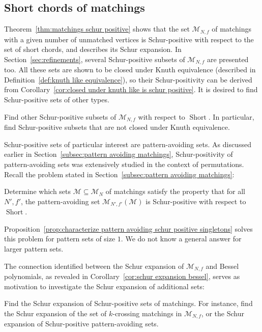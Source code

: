 \documentclass[ALCO]{cedram}
\newcommand{\Short}{\operatorname{Short}}
\newcommand{\M}{\mathcal{M}}
\begin{document}
\subsection{Short chords of matchings}
Theorem~\ref{thm:matchings schur positive} shows that the set $\M_{N,f}$ of matchings with a given number of unmatched vertices is Schur-positive with respect to the set of short chords, and describes its Schur expansion. In Section~\ref{sec:refinements}, several Schur-positive subsets of $\M_{N,f}$ are presented too. All these sets are shown to be closed under Knuth equivalence (described in Definition~\ref{def:knuth like equivalence}), so their Schur-positivity can be derived from Corollary~\ref{cor:closed under knuth like is schur positive}. It is desired to find Schur-positive sets of other types.
\begin{problem}
    Find other Schur-positive subsets of $\M_{N,f}$ with respect to $\Short$. In particular, find Schur-positive subsets that are not closed under Knuth equivalence.
\end{problem}

Schur-positive sets of particular interest are pattern-avoiding sets. As discussed earlier in Section~\ref{subsec:pattern avoiding matchings}, Schur-positivity of pattern-avoiding sets was extensively studied in the context of permutations. Recall the problem stated in Section~\ref{subsec:pattern avoiding matchings}:
\begin{problem*}
    Determine which sets $\M \subseteq \M_N$ of matchings satisfy the property that for all $N',f'$, the pattern-avoiding set $\M_{N',f'}(\M)$ is Schur-positive with respect to $\Short$.
\end{problem*}

Proposition~\ref{prop:characterize pattern avoiding schur positive singletons} solves this problem for pattern sets of size $1$. We do not know a general answer for larger pattern sets.

The connection identified between the Schur expansion of $\M_{N,f}$ and Bessel polynomials, as revealed in Corollary~\ref{cor:schur expansion bessel}, serves as motivation to investigate the Schur expansion of additional sets:
\begin{problem}
    Find the Schur expansion of Schur-positive sets of matchings. For instance, find the Schur expansion of the set of $k$-crossing matchings in $\M_{N,f}$, or the Schur expansion of Schur-positive pattern-avoiding sets.
\end{problem}
\end{document}
